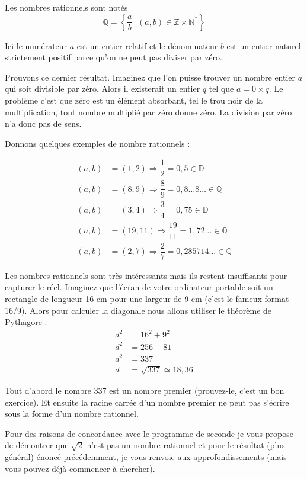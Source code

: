 \documentclass[11pt]{article}
\begin{document}
Les nombres rationnels sont notés \[\mathbb{Q} =
   \left\{\dfrac{a}{b}\,|\,(a,
   b)\in\mathbb{Z}\times\mathbb{N}^*\right\}\]

Ici le numérateur \(a\) est un entier relatif et le dénominateur \(b\)
est un entier naturel strictement positif parce qu'on ne peut pas
diviser par zéro.

Prouvons ce dernier résultat. Imaginez que l'on puisse trouver un
nombre entier \(a\) qui soit divisible par zéro. Alors il existerait
un entier \(q\) tel que \(a = 0\times q\). Le problème c'est que zéro
est un élément absorbant, tel le trou noir de la multiplication,
tout nombre multiplié par zéro donne zéro. La division par zéro n'a
donc pas de sens.

Donnons quelques exemples de nombre rationnels :

\begin{align}
(a, b) &= (1, 2)\Rightarrow \dfrac{1}{2} = 0,5\in\mathbb{D}\\
(a, b) &= (8, 9)\Rightarrow \dfrac{8}{9} = 0,8\dots 8\dots\in\mathbb{Q}\\
(a, b) &= (3, 4)\Rightarrow \dfrac{3}{4} = 0,75\in\mathbb{D}\\
(a, b) &= (19, 11)\Rightarrow \dfrac{19}{11} = 1,72\dots \in\mathbb{Q}\\
(a, b) &= (2, 7)\Rightarrow \dfrac{2}{7} = 0,285714\dots \in\mathbb{Q}
\end{align}


Les nombres rationnels sont très intéressants mais ils restent
insuffisants pour capturer le réel. Imaginez que l'écran de votre
ordinateur portable soit un rectangle de longueur 16 cm pour une
largeur de 9 cm (c'est le fameux format 16/9). Alors pour calculer
la diagonale nous allons utiliser le théorème de Pythagore :
\begin{align*}
d^2 &= 16^2 + 9^2\\
d^2 &= 256 + 81\\
d^2 &= 337\\
d &= \sqrt{337} \simeq 18,36
\end{align*}

Tout d'abord le nombre 337 est un nombre premier (prouvez-le, c'est
un bon exercice). Et ensuite la racine carrée d'un nombre premier
ne peut pas s'écrire sous la forme d'un nombre rationnel.

Pour des raisons de concordance avec le programme de seconde je
vous propose de démontrer que \(\sqrt{2}\) n'est pas un nombre
rationnel et pour le résultat (plus général) énoncé précédemment,
je vous renvoie aux approfondissements (mais vous pouvez déjà
commencer à chercher).
\end{document}
